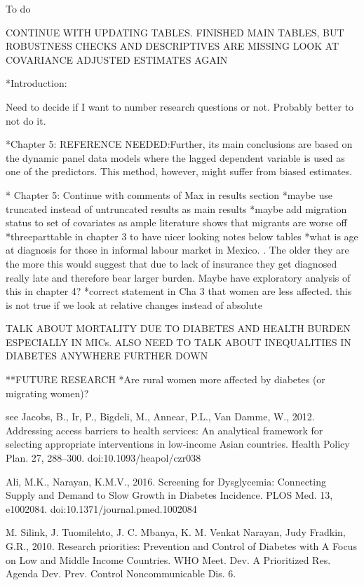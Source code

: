 To do


CONTINUE WITH UPDATING TABLES. FINISHED MAIN TABLES, BUT ROBUSTNESS CHECKS AND DESCRIPTIVES ARE MISSING
LOOK AT COVARIANCE ADJUSTED ESTIMATES AGAIN

*Introduction:

Need to decide if I want to number research questions or not. Probably better to not do it.

*Chapter 5:  REFERENCE NEEDED:Further, its main conclusions are based on the dynamic panel data models where the lagged dependent variable is used as one of the predictors. This method, however, might suffer from biased estimates.

* Chapter 5: Continue with comments of Max in results section
*maybe use truncated instead of untruncated results as main results
*maybe add migration status to set of covariates as ample literature shows that migrants are worse off
*threeparttable in chapter 3 to have nicer looking notes below tables
*what is age at diagnosis for those in informal labour market in Mexico. . The older they are the more this would suggest that due to lack of insurance they get diagnosed really late and therefore bear larger burden. Maybe have exploratory analysis of this in chapter 4?
*correct statement in Cha 3 that women are less affected. this is not true if we look at relative changes instead of absolute

TALK ABOUT MORTALITY DUE TO DIABETES AND HEALTH BURDEN ESPECIALLY IN MICs. ALSO NEED TO TALK ABOUT INEQUALITIES IN DIABETES ANYWHERE FURTHER DOWN


**FUTURE RESEARCH
*Are rural women more affected by diabetes (or migrating women)?




see Jacobs, B., Ir, P., Bigdeli, M., Annear, P.L., Van Damme, W., 2012. Addressing access barriers to health services: An analytical framework for selecting appropriate interventions in low-income Asian countries. Health Policy Plan. 27, 288–300. doi:10.1093/heapol/czr038

Ali, M.K., Narayan, K.M.V., 2016. Screening for Dysglycemia: Connecting Supply and Demand to Slow Growth in Diabetes Incidence. PLOS Med. 13, e1002084. doi:10.1371/journal.pmed.1002084

M. Silink, J. Tuomilehto, J. C. Mbanya, K. M. Venkat Narayan, Judy Fradkin, G.R., 2010. Research priorities: Prevention and Control of Diabetes with A Focus on Low and Middle Income Countries. WHO Meet. Dev. A Prioritized Res. Agenda Dev. Prev. Control Noncommunicable Dis. 6.
